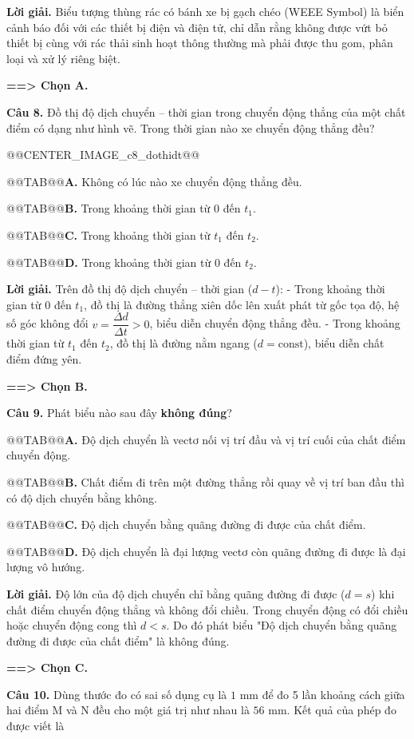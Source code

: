 \documentclass[11pt,a4paper]{article}
\begin{document}
\textbf{Lời giải.} Biểu tượng thùng rác có bánh xe bị gạch chéo (WEEE Symbol) là biển cảnh báo đối với các thiết bị điện và điện tử, chỉ dẫn rằng không được vứt bỏ thiết bị cùng với rác thải sinh hoạt thông thường mà phải được thu gom, phân loại và xử lý riêng biệt.

\textbf{==> Chọn A.}

\textbf{Câu 8.} Đồ thị độ dịch chuyển -- thời gian trong chuyển động thẳng của một chất điểm có dạng như hình vẽ. Trong thời gian nào xe chuyển động thẳng đều?

@@CENTER_IMAGE_c8_dothidt@@

@@TAB@@\textbf{A.} Không có lúc nào xe chuyển động thẳng đều.

@@TAB@@\textbf{B.} Trong khoảng thời gian từ $0$ đến $t_1$.

@@TAB@@\textbf{C.} Trong khoảng thời gian từ $t_1$ đến $t_2$.

@@TAB@@\textbf{D.} Trong khoảng thời gian từ $0$ đến $t_2$.

\textbf{Lời giải.} Trên đồ thị độ dịch chuyển -- thời gian ($d - t$):
- Trong khoảng thời gian từ $0$ đến $t_1$, đồ thị là đường thẳng xiên dốc lên xuất phát từ gốc tọa độ, hệ số góc không đổi $v = \dfrac{\Delta d}{\Delta t} > 0$, biểu diễn chuyển động thẳng đều.
- Trong khoảng thời gian từ $t_1$ đến $t_2$, đồ thị là đường nằm ngang ($d = \text{const}$), biểu diễn chất điểm đứng yên.

\textbf{==> Chọn B.}

\textbf{Câu 9.} Phát biểu nào sau đây \textbf{không đúng}?

@@TAB@@\textbf{A.} Độ dịch chuyển là vectơ nối vị trí đầu và vị trí cuối của chất điểm chuyển động.

@@TAB@@\textbf{B.} Chất điểm đi trên một đường thẳng rồi quay về vị trí ban đầu thì có độ dịch chuyển bằng không.

@@TAB@@\textbf{C.} Độ dịch chuyển bằng quãng đường đi được của chất điểm.

@@TAB@@\textbf{D.} Độ dịch chuyển là đại lượng vectơ còn quãng đường đi được là đại lượng vô hướng.

\textbf{Lời giải.} Độ lớn của độ dịch chuyển chỉ bằng quãng đường đi được ($d = s$) khi chất điểm chuyển động thẳng và không đổi chiều. Trong chuyển động có đổi chiều hoặc chuyển động cong thì $d < s$. Do đó phát biểu "Độ dịch chuyển bằng quãng đường đi được của chất điểm" là không đúng.

\textbf{==> Chọn C.}

\textbf{Câu 10.} Dùng thước đo có sai số dụng cụ là $1\text{ mm}$ để đo 5 lần khoảng cách giữa hai điểm M và N đều cho một giá trị như nhau là $56\text{ mm}$. Kết quả của phép đo được viết là
\end{document}
